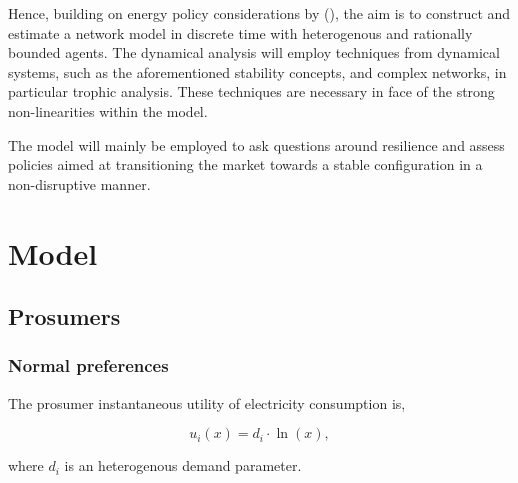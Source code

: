 \documentclass[american]{scrartcl}
\begin{document}
Hence, building on energy policy considerations by \citeauthor{Parag2016} (\citeyear{Parag2016}), the aim is to construct and estimate a network model in discrete time with heterogenous and rationally bounded agents. The dynamical analysis will employ techniques from dynamical systems, such as the aforementioned stability concepts, and complex networks, in particular trophic analysis. These techniques are necessary in face of the strong non-linearities within the model.

The model will mainly be employed to ask questions around resilience and assess policies aimed at transitioning the market towards a stable configuration in a non-disruptive manner.

\newpage
{} %
\printbibliography

\newpage
\appendix

\section{Model}

\subsection{Prosumers}

\subsubsection{Normal preferences}

The prosumer instantaneous utility of electricity consumption is,

\begin{equation*}
    u_i(x) = d_i \cdot \ln(x),
\end{equation*}

where $d_i$ is an heterogenous demand parameter.
\end{document}
